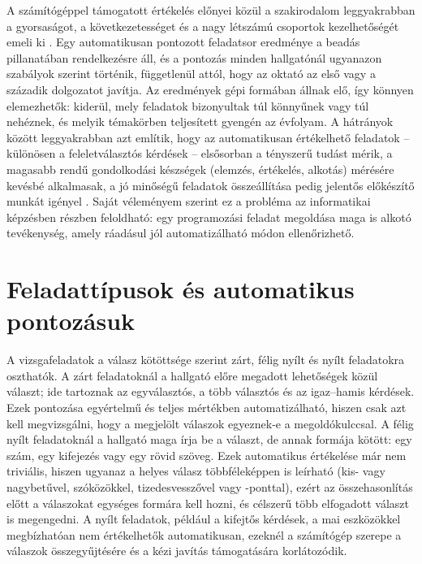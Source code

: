 A számítógéppel támogatott értékelés előnyei közül a szakirodalom leggyakrabban a gyorsaságot, a
következetességet és a nagy létszámú csoportok kezelhetőségét emeli ki \cite{bull2004blueprint}.
Egy automatikusan pontozott feladatsor eredménye a beadás pillanatában rendelkezésre áll, és a
pontozás minden hallgatónál ugyanazon szabályok szerint történik, függetlenül attól, hogy az
oktató az első vagy a századik dolgozatot javítja. Az eredmények gépi formában állnak elő, így
könnyen elemezhetők: kiderül, mely feladatok bizonyultak túl könnyűnek vagy túl nehéznek, és
melyik témakörben teljesített gyengén az évfolyam. A hátrányok között leggyakrabban azt
említik, hogy az automatikusan értékelhető feladatok -- különösen a feleletválasztós kérdések --
elsősorban a tényszerű tudást mérik, a magasabb rendű gondolkodási készségek (elemzés,
értékelés, alkotás) mérésére kevésbé alkalmasak, a jó minőségű feladatok összeállítása pedig
jelentős előkészítő munkát igényel \cite{bull2004blueprint}. Saját véleményem szerint ez a
probléma az informatikai képzésben részben feloldható: egy programozási feladat megoldása maga
is alkotó tevékenység, amely ráadásul jól automatizálható módon ellenőrizhető.

\section{Feladattípusok és automatikus pontozásuk}
\label{sec:feladattipusok}

A vizsgafeladatok a válasz kötöttsége szerint zárt, félig nyílt és nyílt feladatokra oszthatók. A
zárt feladatoknál a hallgató előre megadott lehetőségek közül választ; ide tartoznak az
egyválasztós, a több választós és az igaz--hamis kérdések. Ezek pontozása egyértelmű és teljes
mértékben automatizálható, hiszen csak azt kell megvizsgálni, hogy a megjelölt válaszok
egyeznek-e a megoldókulccsal. A félig nyílt feladatoknál a hallgató maga írja be a választ, de
annak formája kötött: egy szám, egy kifejezés vagy egy rövid szöveg. Ezek automatikus értékelése
már nem triviális, hiszen ugyanaz a helyes válasz többféleképpen is leírható (kis- vagy
nagybetűvel, szóközökkel, tizedesvesszővel vagy -ponttal), ezért az összehasonlítás előtt a
válaszokat egységes formára kell hozni, és célszerű több elfogadott választ is megengedni. A
nyílt feladatok, például a kifejtős kérdések, a mai eszközökkel megbízhatóan nem értékelhetők
automatikusan, ezeknél a számítógép szerepe a válaszok összegyűjtésére és a kézi javítás
támogatására korlátozódik.

